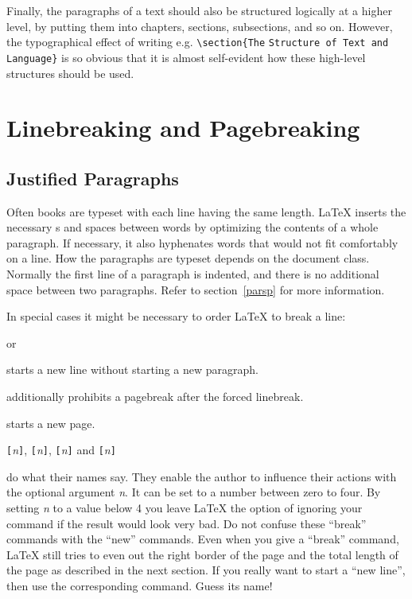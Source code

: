Finally, the paragraphs of a text should also be structured logically
at a higher level, by putting them into chapters, sections,
subsections, and so on.  However, the typographical effect of writing
e.g.{} \verb|\section{The| \texttt{Structure of Text and Language}\verb|}| is
so obvious that it is almost self-evident how these high-level
structures should be used.

\section{Linebreaking and Pagebreaking}
 
\subsection{Justified Paragraphs}

Often books are typeset with each line having the same length.
\LaTeX{} inserts the necessary s and spaces between words
by optimizing the contents of a whole paragraph. If necessary, it
also hyphenates words that would not fit comfortably on a line.
How the paragraphs are typeset depends on the document class.
Normally the first line of a paragraph is indented, and there is no
additional space between two paragraphs. Refer to section~\ref{parsp}
for more information.

In special cases it might be necessary to order \LaTeX{} to break a
line: 
\begin{command}
\ci{\bs} or  
\end{command}
\noindent starts a new line without starting a new paragraph. 

\begin{command}
\ci{\bs*}
\end{command}
\noindent additionally prohibits a pagebreak after the forced
linebreak. 

\begin{command}
\end{command}
\noindent starts a new page. 

\begin{command}
\verb|[|\emph{n}\verb|]|,
\verb|[|\emph{n}\verb|]|, 
\verb|[|\emph{n}\verb|]| and
\verb|[|\emph{n}\verb|]|
\end{command}
\noindent do what their names say. They enable the author to influence their
actions with the optional argument \emph{n}. It can be set to a number
between zero to four. By setting \emph{n} to a value below 4 you leave
\LaTeX{} the option of ignoring your command if the result would look very
bad. Do not confuse these ``break'' commands with the ``new'' commands. Even
when you give a ``break'' command, \LaTeX{} still tries to even out the
right border of the page and the total length of the page as described in
the next section. If you really want to start a ``new line'', then use the
corresponding command. Guess its name!

